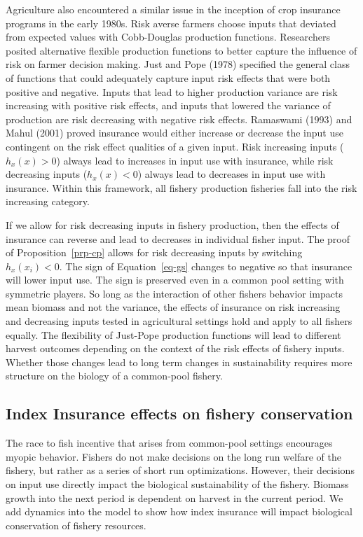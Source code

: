 \documentclass[
  letterpaper,
  DIV=11,
  numbers=noendperiod]{scrartcl}
\theoremstyle{plain}
\theoremstyle{plain}
\theoremstyle{remark}
\begin{document}
Agriculture also encountered a similar issue in the inception of crop
insurance programs in the early 1980s. Risk averse farmers choose inputs
that deviated from expected values with Cobb-Douglas production
functions. Researchers posited alternative flexible production functions
to better capture the influence of risk on farmer decision making. Just
and Pope (1978) specified the general class of functions that could
adequately capture input risk effects that were both positive and
negative. Inputs that lead to higher production variance are risk
increasing with positive risk effects, and inputs that lowered the
variance of production are risk decreasing with negative risk effects.
Ramaswami (1993) and Mahul (2001) proved insurance would either increase
or decrease the input use contingent on the risk effect qualities of a
given input. Risk increasing inputs (\(h_x(x)>0\)) always lead to
increases in input use with insurance, while risk decreasing inputs
(\(h_x(x)<0\)) always lead to decreases in input use with insurance.
Within this framework, all fishery production fisheries fall into the
risk increasing category.

If we allow for risk decreasing inputs in fishery production, then the
effects of insurance can reverse and lead to decreases in individual
fisher input. The proof of Proposition~\ref{prp-cp} allows for risk
decreasing inputs by switching \(h_{x}(x_i)<0\). The sign of
Equation~\ref{eq-gs} changes to negative so that insurance will lower
input use. The sign is preserved even in a common pool setting with
symmetric players. So long as the interaction of other fishers behavior
impacts mean biomass and not the variance, the effects of insurance on
risk increasing and decreasing inputs tested in agricultural settings
hold and apply to all fishers equally. The flexibility of Just-Pope
production functions will lead to different harvest outcomes depending
on the context of the risk effects of fishery inputs. Whether those
changes lead to long term changes in sustainability requires more
structure on the biology of a common-pool fishery.

\hypertarget{index-insurance-effects-on-fishery-conservation}{%
\subsection{Index Insurance effects on fishery
conservation}\label{index-insurance-effects-on-fishery-conservation}}

The race to fish incentive that arises from common-pool settings
encourages myopic behavior. Fishers do not make decisions on the long
run welfare of the fishery, but rather as a series of short run
optimizations. However, their decisions on input use directly impact the
biological sustainability of the fishery. Biomass growth into the next
period is dependent on harvest in the current period. We add dynamics
into the model to show how index insurance will impact biological
conservation of fishery resources.
\end{document}
